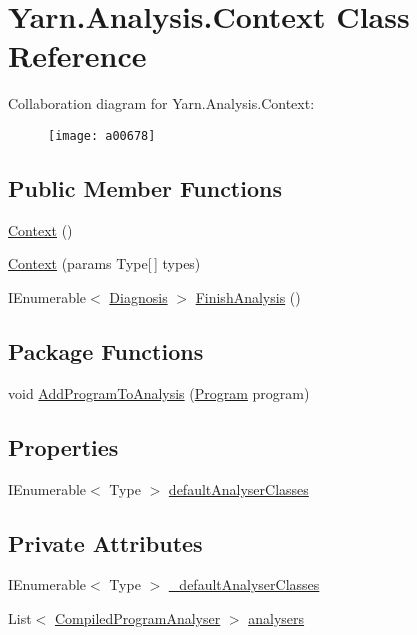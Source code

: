 \hypertarget{a00056}{\section{Yarn.\-Analysis.\-Context Class Reference}
\label{a00056}
}


Collaboration diagram for Yarn.\-Analysis.\-Context\-:
\nopagebreak
\begin{figure}[H]
\begin{center}
\leavevmode
\texttt{[image: a00678]}
\end{center}
\end{figure}
\subsection*{Public Member Functions}
\begin{DoxyCompactItemize}
\item 
\hyperlink{a00056_a8e2c56843e8d374b0f90e23326d8d14a}{Context} ()
\item 
\hyperlink{a00056_ad5f41fb64637c4938bce811153492731}{Context} (params Type\mbox{[}$\,$\mbox{]} types)
\item 
I\-Enumerable$<$ \hyperlink{a00089}{Diagnosis} $>$ \hyperlink{a00056_a1eadea062a5899a64d00ea0172cbbb43}{Finish\-Analysis} ()
\end{DoxyCompactItemize}
\subsection*{Package Functions}
\begin{DoxyCompactItemize}
\item 
void \hyperlink{a00056_a60255a6d54f296d199507acef251244c}{Add\-Program\-To\-Analysis} (\hyperlink{a00140}{Program} program)
\end{DoxyCompactItemize}
\subsection*{Properties}
\begin{DoxyCompactItemize}
\item 
I\-Enumerable$<$ Type $>$ \hyperlink{a00056_afdf24f2512251c2203ba1bde8f4a0f90}{default\-Analyser\-Classes}
\end{DoxyCompactItemize}
\subsection*{Private Attributes}
\begin{DoxyCompactItemize}
\item 
I\-Enumerable$<$ Type $>$ \hyperlink{a00056_ad06829cf848a5936db5724ebced758ec}{\-\_\-default\-Analyser\-Classes}
\item 
List$<$ \hyperlink{a00052}{Compiled\-Program\-Analyser} $>$ \hyperlink{a00056_aa5c7eaa90ad9c47969a3b336080d8991}{analysers}
\end{DoxyCompactItemize}


